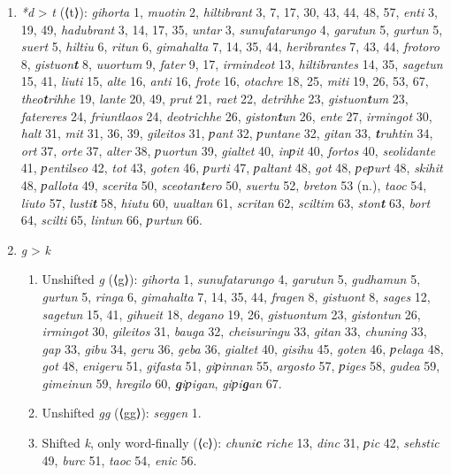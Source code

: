 \begin{enumerate}
\begin{enumerate}
    \item \emph{*d} > \emph{t} (⟨t⟩): \emph{gihorta} 1, \emph{muotin} 2, \emph{hiltibrant} 3, 7, 17, 30, 43, 44, 48, 57, \emph{enti} 3, 19, 49, \emph{hadubrant} 3, 14, 17, 35, \emph{untar} 3, \emph{sunufatarungo} 4, \emph{garutun} 5, \emph{gurtun} 5, \emph{suert} 5, \emph{hiltiu} 6, \emph{ritun} 6, \emph{gimahalta} 7, 14, 35, 44, %
    \emph{heribrantes} 7, 43, 44, \emph{frotoro} 8, \emph{gistuon\textbf{t}} 8, \emph{uuortum} 9, \emph{fater} 9, 17, \emph{irmindeot} 13, \emph{hiltibrantes} 14, 35, \emph{sagetun} 15, 41, \emph{liuti} 15, \emph{alte} 16, \emph{anti} 16, \emph{frote} 16, \emph{otachre} 18, 25, \emph{miti} 19, 26, 53, 67, %
    \emph{theo\textbf{t}rihhe} 19, \emph{lante} 20, 49, \emph{prut} 21, \emph{raet} 22, \emph{detrihhe} 23, \emph{gistuon\textbf{t}um} 23, \emph{fatereres} 24, \emph{friuntlaos} 24, \emph{deotrichhe} 26, \emph{giston\textbf{t}un} 26, \emph{ente} 27, \emph{irmingot} 30, %
    \emph{halt} 31, \emph{mit} 31, 36, 39, \emph{gileitos} 31, \emph{ƿant} 32, \emph{ƿuntane} 32, \emph{gitan} 33, \emph{\textbf{t}ruhtin} 34, \emph{ort} 37, \emph{orte} 37, \emph{alter} 38, \emph{ƿuortun} 39, \emph{gialtet} 40, \emph{inƿit} 40, \emph{fortos} 40, \emph{seolidante} 41, %
    \emph{ƿentilseo} 42, \emph{tot} 43, \emph{goten} 46, \emph{ƿurti} 47, \emph{ƿaltant} 48, \emph{got} 48, \emph{ƿeƿurt} 48, \emph{skihit} 48, \emph{ƿallota} 49, \emph{scerita} 50, \emph{sceotan\textbf{t}ero} 50, \emph{suertu} 52, \emph{breton} 53 (n.), \emph{taoc} 54, \emph{liuto} 57, %
    \emph{lusti\textbf{t}} 58, \emph{hiutu} 60, \emph{uualtan} 61, \emph{scritan} 62, \emph{sciltim} 63, \emph{ston\textbf{t}} 63, \emph{bort} 64, \emph{scilti} 65, \emph{lintun} 66, \emph{ƿurtun} 66. %

    \item \emph{g} > \emph{k} \begin{enumerate}
      \item Unshifted \emph{g} (⟨g⟩): \emph{gihorta} 1, \emph{sunufatarungo} 4, \emph{garutun} 5, \emph{gudhamun} 5, \emph{gurtun} 5, \emph{ringa} 6, \emph{gimahalta} 7, 14, 35, 44, \emph{fragen} 8, \emph{gistuont} 8, \emph{sages} 12, \emph{sagetun} 15, 41, \emph{gihueit} 18, \emph{degano} 19, 26, %
      \emph{gistuontum} 23, \emph{gistontun} 26, \emph{irmingot} 30, \emph{gileitos} 31, \emph{bauga} 32, \emph{cheisuringu} 33, \emph{gitan} 33, \emph{chuning} 33, \emph{gap} 33, \emph{gibu} 34, \emph{geru} 36, \emph{geba} 36, \emph{gialtet} 40, \emph{gisihu} 45, \emph{goten} 46, \emph{ƿelaga} 48, %
      \emph{got} 48, \emph{enigeru} 51, \emph{gifasta} 51, \emph{giƿinnan} 55, \emph{argosto} 57, \emph{ƿiges} 58, \emph{gudea} 59, \emph{gimeinun} 59, \emph{hregilo} 60, \emph{\textbf{g}iƿigan}, \emph{giƿi\textbf{g}an} 67. %
      \item Unshifted \emph{gg} (⟨gg⟩): \emph{seggen} 1.%
      \item Shifted \emph{k}, only word-finally (⟨c⟩): \emph{chuni\textbf{c}\- riche} 13, \emph{dinc} 31, \emph{ƿic} 42, \emph{sehstic} 49, \emph{burc} 51, \emph{taoc} 54, \emph{enic} 56.
    \end{enumerate}
  \end{enumerate}

\end{enumerate}

